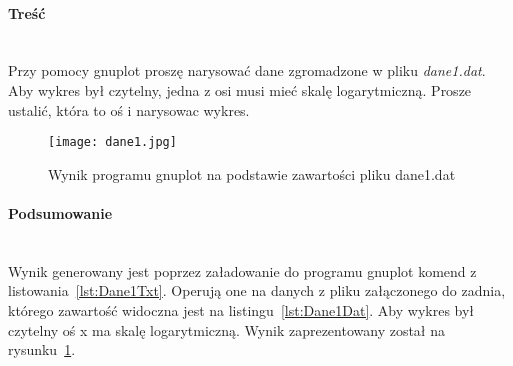 \paragraph{Treść}~\\
Przy pomocy gnuplot proszę narysować dane zgromadzone w pliku \textit{dane1.dat}.
Aby wykres był czytelny, jedna z osi musi mieć skalę logarytmiczną.
Prosze ustalić, która to oś i narysowac wykres.





\begin{figure}[p]
  \caption{Wynik programu gnuplot na podstawie zawartości pliku dane1.dat}
  \label{fig:Dane1Jpg}
  \centering
  \texttt{[image: dane1.jpg]}
\end{figure}

\paragraph{Podsumowanie}~\\
Wynik generowany jest poprzez załadowanie do programu gnuplot komend z listowania~\ref{lst:Dane1Txt}.
Operują one na danych z pliku załączonego do zadnia, którego zawartość widoczna jest na listingu~\ref{lst:Dane1Dat}.
Aby wykres był czytelny oś x ma skalę logarytmiczną.
Wynik zaprezentowany został na rysunku~\ref{fig:Dane1Jpg}.
